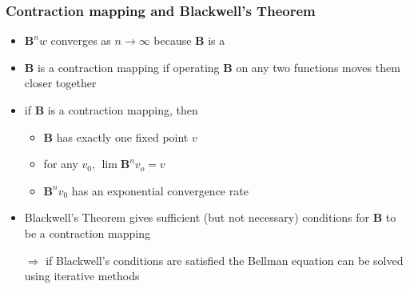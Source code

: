 \documentclass[compress,aspectratio=169]{beamer}
\begin{document}
\begin{frame}
\frametitle{Contraction mapping and Blackwell's Theorem}
\begin{itemize}
\item $\mathbf B^nw$ converges as $n\rightarrow \infty$ because $\mathbf B$ is a {\color{red!70!white}{contraction mapping}}
\item $\mathbf B$ is a contraction mapping if operating $\mathbf B$ on any two functions moves them closer together
\vspace{3 mm}
\item if $\mathbf B$ is a contraction mapping, then 
	\begin{itemize}
	\item $\mathbf B$ has exactly one fixed point $v$
	\item for any $v_0$, $\lim \mathbf B^nv_o=v$
	\item $\mathbf B^nv_0$ has an exponential convergence rate 
	\end{itemize}
\vspace{3 mm}
\item Blackwell's Theorem gives sufficient (but not necessary) conditions for $\mathbf B$ to be a contraction mapping
\vspace{3 mm}
\item[$\Rightarrow$] if Blackwell's conditions are satisfied the Bellman equation can be solved using iterative methods
\end{itemize}
\end{frame}
\end{document}
